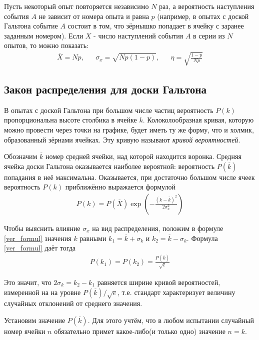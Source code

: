 Пусть некоторый опыт повторяется независимо $N$ раз, а вероятность наступления события $A$ не зависит от номера опыта и равна $p$ (например, в опытах с доской Гальтона событие $A$ состоит в том, что зёрнышко попадает в ячейку с заранее заданным номером). Если $X$ - число наступлений события $A$ в серии из $N$ опытов, то можно показать:
\begin{align}
	\overline{X} = N p, && \sigma_x = \sqrt{N p (1 - p)}, && \eta = \sqrt{\frac{1 - p}{N p}}
\end{align}

\subsection{Закон распределения для доски Гальтона}

В опытах с доской Гальтона при большом числе частиц вероятность $P(k)$ пропорциональна высоте столбика в ячейке $k$. Колоколообразная кривая, которую можно провести через точки на графике, будет иметь ту же форму, что и холмик, образованный зёрнами  ячейках. Эту кривую называют \textit{кривой вероятностей}.

Обозначим $\overline{k}$ номер средней ячейки, над которой находится воронка. Средняя ячейка доски Гальтона оказывается наиболее вероятной: вероятность $P(\overline{k})$ попадания в неё максимальна. Оказывается, при достаточно большом числе ячеек вероятность $P(k)$ приближённо выражается формулой
\begin{align} \label{ver_formul}
	P(k) = P(\overline{X})
	\exp \left( - \frac{(k - \overline{k})^2}{2 \sigma_x^2} \right)
\end{align}

Чтобы выяснить влияние $\sigma_x$ на вид распределения, положим в формуле \eqref{ver_formul} значения $k$ равными $k_1 = \overline{k} + \sigma_k$ и $k_2 = \overline{k} - \sigma_k$. Формула \eqref{ver_formul} даёт тогда 
\begin{align*}
	P(k_1) = P(k_2) = \frac{P(\overline{k})}{\sqrt{e}} 
\end{align*}

Это значит, что $2\sigma_k = k_2 - k_1$ равняется ширине кривой вероятностей, измеренной на на уровне ${P(\overline{k})}/{\sqrt{e}}$, т.е. стандарт характеризует величину случайных отклонений от среднего значения.

Установим значение $P(\overline{k})$. Для этого учтём, что в любом испытании случайный номер ячейки $n$ обязательно примет какое-либо(и только одно) значение $n = k$. 